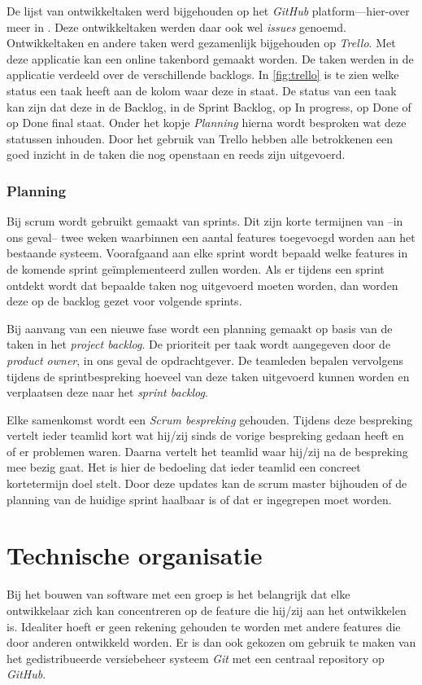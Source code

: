 De lijst van ontwikkeltaken werd bijgehouden op het \emph{GitHub} platform—{hier-over} meer in . Deze ontwikkeltaken werden daar ook wel \emph{issues} genoemd. Ontwikkeltaken en andere taken werd gezamenlijk bijgehouden op \emph{Trello}. Met deze applicatie kan een online takenbord gemaakt worden. De taken werden in de applicatie verdeeld over de verschillende backlogs. In \autoref{fig:trello} is te zien welke status een taak heeft aan de kolom waar deze in staat. De status van een taak kan zijn dat deze in de Backlog, in de Sprint Backlog, op In progress, op Done of op Done final staat. Onder het kopje \emph{Planning} hierna wordt besproken wat deze statussen inhouden. Door het gebruik van Trello hebben alle betrokkenen een goed inzicht in de taken die nog openstaan en reeds zijn uitgevoerd.

\subsubsection{Planning}
Bij scrum wordt gebruikt gemaakt van sprints. Dit zijn korte termijnen van --in ons geval-- twee weken waarbinnen een aantal features toegevoegd worden aan het bestaande systeem. Voorafgaand aan elke sprint wordt bepaald welke features in de komende sprint geïmplementeerd zullen worden. Als er tijdens een sprint ontdekt wordt dat bepaalde taken nog uitgevoerd moeten worden, dan worden deze op de backlog gezet voor volgende sprints.

Bij aanvang van een nieuwe fase wordt een planning gemaakt op basis van de taken in het \emph{project backlog}. De prioriteit per taak wordt aangegeven door de \emph{product owner}, in ons geval de opdrachtgever. De teamleden bepalen vervolgens tijdens de sprintbespreking hoeveel van deze taken uitgevoerd kunnen worden en verplaatsen deze naar het \emph{sprint backlog}. 

Elke samenkomst wordt een \emph{Scrum bespreking} gehouden. Tijdens deze bespreking vertelt ieder teamlid kort wat hij/zij sinds de vorige bespreking gedaan heeft en of er problemen waren. Daarna vertelt het teamlid waar hij/zij na de bespreking mee bezig gaat. Het is hier de bedoeling dat ieder teamlid een concreet kortetermijn doel stelt. Door deze updates kan de scrum master bijhouden of de planning van de huidige sprint haalbaar is of dat er ingegrepen moet worden.

\section{Technische organisatie} \label{sec:technische_organisatie}
Bij het bouwen van software met een groep is het belangrijk dat elke ontwikkelaar zich kan concentreren op de feature die hij/zij aan het ontwikkelen is. Idealiter hoeft er geen rekening gehouden te worden met andere features die door anderen ontwikkeld worden. Er is dan ook gekozen om gebruik te maken van het gedistribueerde versiebeheer systeem \emph{Git} met een centraal repository op \emph{GitHub}.

